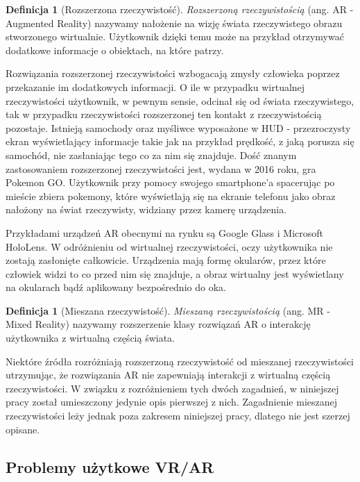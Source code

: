 \documentclass[a4paper,11pt,twoside]{report}
\theoremstyle{definition}
\newtheorem{definition}[theorem]{Definicja}
\begin{document}
\begin{definition}[Rozszerzona rzeczywistość]
\textit{Rozszerzoną rzeczywistością} (ang. AR - Augmented Reality) nazywamy nałożenie na wizję świata rzeczywistego obrazu stworzonego wirtualnie. Użytkownik dzięki temu może na przykład otrzymywać dodatkowe informacje o obiektach, na które patrzy.
\end{definition}

Rozwiązania rozszerzonej rzeczywistości wzbogacają zmysły człowieka poprzez przekazanie im dodatkowych informacji. O ile w przypadku wirtualnej rzeczywistości użytkownik, w pewnym sensie, odcinał się od świata rzeczywistego, tak w przypadku rzeczywistości rozszerzonej ten kontakt z rzeczywistością pozostaje. Istnieją samochody oraz myśliwce wyposażone w HUD - przezroczysty ekran wyświetlający informacje takie jak na przykład prędkość, z jaką porusza się samochód, nie zasłaniając tego co za nim się znajduje. Dość znanym zastosowaniem rozszerzonej rzeczywistości jest, wydana w 2016 roku, gra Pokemon GO. Użytkownik przy pomocy swojego smartphone'a spacerując po mieście zbiera pokemony, które wyświetlają się na ekranie telefonu jako obraz nałożony na  świat rzeczywisty, widziany przez kamerę urządzenia.

Przykładami urządzeń AR obecnymi na rynku są Google Glass i Microsoft HoloLens. W odróżnieniu od wirtualnej rzeczywistości, oczy użytkownika nie zostają zasłonięte całkowicie. Urządzenia mają formę okularów, przez które człowiek widzi to co przed nim się znajduje, a obraz wirtualny jest wyświetlany na okularach bądź aplikowany bezpośrednio do oka.

\begin{definition}[Mieszana rzeczywistość]
\textit{Mieszaną rzeczywistością} (ang. MR - Mixed Reality) nazywamy rozszerzenie klasy rozwiązań AR o interakcję użytkownika z wirtualną częścią świata.
\end{definition}

Niektóre źródła\cite{ARMRdifferences} rozróżniają rozszerzoną rzeczywistość od mieszanej rzeczywistości utrzymując, że rozwiązania AR nie zapewniają interakcji z wirtualną częścią rzeczywistości. W związku z rozróżnieniem tych dwóch zagadnień, w niniejszej pracy został umieszczony jedynie opis pierwszej z nich. Zagadnienie mieszanej rzeczywistości leży jednak poza zakresem niniejszej pracy, dlatego nie jest szerzej opisane. 

\subsection{Problemy użytkowe VR/AR }
\end{document}
